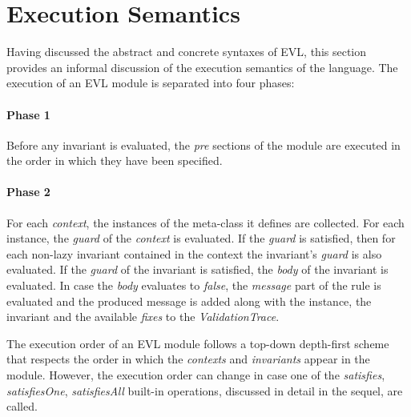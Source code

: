 \section{Execution Semantics}
\label{sec:Design.EVL.ExecutionSemantics}

Having discussed the abstract and concrete syntaxes of EVL, this section provides an informal discussion of the execution semantics of the language. The execution of an EVL module is separated into four phases:


\paragraph{Phase 1} Before any invariant is evaluated, the \emph{pre} sections of the module are executed in the order in which they have been specified.

\paragraph {Phase 2} For each \emph{context}, the instances of the meta-class it defines are collected. For each instance, the \emph{guard} of the \emph{context} is evaluated. If the \emph{guard} is satisfied, then for each non-lazy invariant contained in the context the invariant's \emph{guard} is also evaluated. If the \emph{guard} of the invariant is satisfied, the \emph{body} of the invariant is evaluated. In case the \emph{body} evaluates to \emph{false}, the \emph{message} part of the rule is evaluated and the produced message is added along with the instance, the invariant and the available \emph{fixes} to the \emph{ValidationTrace}. 

The execution order of an EVL module follows a top-down depth-first scheme that respects the order in which the \emph{contexts} and \emph{invariants} appear in the module. However, the execution order can change in case one of the \emph{satisfies}, \emph{satisfiesOne}, \emph{satisfiesAll} built-in operations, discussed in detail in the sequel, are called.

